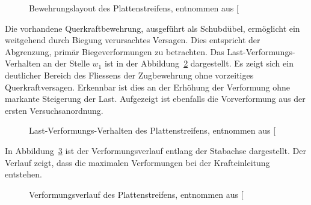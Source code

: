 \documentclass[
  12pt,
  letterpaper,
  egregdoesnotlikesansseriftitles]{scrreprt}
\begin{document}
\begin{figure}[H]


\caption{\label{fig-bewehrung_a3v2}Bewehrungslayout des
Plattenstreifens, entnommen aus {[}\citeproc{ref-Jaeger2006}{1}{]}}

\end{figure}%

Die vorhandene Querkraftbewehrung, ausgeführt als Schubdübel, ermöglicht
ein weitgehend durch Biegung verursachtes Versagen. Dies entspricht der
Abgrenzung, primär Biegeverformungen zu betrachten. Das
Last-Verformungs-Verhalten an der Stelle \(w_1\) ist in der
Abbildung~\ref{fig-lastverformung_a3v2} dargestellt. Es zeigt sich ein
deutlicher Bereich des Fliessens der Zugbewehrung ohne vorzeitiges
Querkraftversagen. Erkennbar ist dies an der Erhöhung der Verformung
ohne markante Steigerung der Last. Aufgezeigt ist ebenfalls die
Vorverformung aus der ersten Versuchsanordnung.

\begin{figure}[H]


\caption{\label{fig-lastverformung_a3v2}Last-Verformungs-Verhalten des
Plattenstreifens, entnommen aus {[}\citeproc{ref-Jaeger2006}{1}{]}}

\end{figure}%

In Abbildung~\ref{fig-verformungsverlauf_a3v2} ist der
Verformungsverlauf entlang der Stabachse dargestellt. Der Verlauf zeigt,
dass die maximalen Verformungen bei der Krafteinleitung entstehen.

\begin{figure}[H]


\caption{\label{fig-verformungsverlauf_a3v2}Verformungsverlauf des
Plattenstreifens, entnommen aus {[}\citeproc{ref-Jaeger2006}{1}{]}}

\end{figure}%
\end{document}
